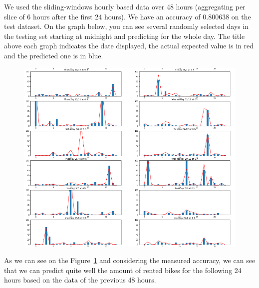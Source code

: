 We used the sliding-windows hourly based data over 48 hours (aggregating per slice
of 6 hours after the first 24 hours).
We have an accuracy of 0.800638 on the test dataset.
On the graph below, you can see several randomly selected days in the testing set
starting at midnight and predicting for the whole day. The title above each graph
indicates the date displayed, the actual expected value is in red and the
predicted one is in blue.
\begin{figure}[H]
\hspace{-0.9cm}
\includegraphics[width=1.1\textwidth]{img/hourly_predictions}
\label{fig:hourly_pred}
\end{figure}

As we can see on the Figure~\ref{fig:hourly_pred} and considering the measured accuracy,
we can see that we can predict quite well the amount of rented bikes for the following
24 hours based on the data of the previous 48 hours.
